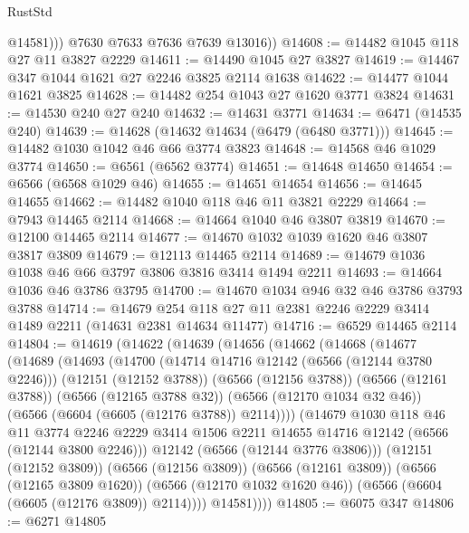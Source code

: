 \begin{lexlean}{RustStd}
\begin{coremodule}
              @14581)))
        @7630
        @7633
        @7636
        @7639
        @13016))
@14608 := @14482 @1045 @118 @27 @11 @3827 @2229
@14611 := @14490 @1045 @27 @3827
@14619 := @14467 @347 @1044 @1621 @27 @2246 @3825 @2114 @1638
@14622 := @14477 @1044 @1621 @3825
@14628 := @14482 @254 @1043 @27 @1620 @3771 @3824
@14631 := @14530 @240 @27 @240
@14632 := @14631 @3771
@14634 := @6471 (@14535 @240)
@14639 := @14628 (@14632 @14634 (@6479 (@6480 @3771)))
@14645 := @14482 @1030 @1042 @46 @66 @3774 @3823
@14648 := @14568 @46 @1029 @3774
@14650 := @6561 (@6562 @3774)
@14651 := @14648 @14650
@14654 := @6566 (@6568 @1029 @46)
@14655 := @14651 @14654
@14656 := @14645 @14655
@14662 := @14482 @1040 @118 @46 @11 @3821 @2229
@14664 := @7943 @14465 @2114
@14668 := @14664 @1040 @46 @3807 @3819
@14670 := @12100 @14465 @2114
@14677 := @14670 @1032 @1039 @1620 @46 @3807 @3817 @3809
@14679 := @12113 @14465 @2114
@14689 := @14679 @1036 @1038 @46 @66 @3797 @3806 @3816 @3414 @1494 @2211
@14693 := @14664 @1036 @46 @3786 @3795
@14700 := @14670 @1034 @946 @32 @46 @3786 @3793 @3788
@14714 := @14679 @254 @118 @27 @11 @2381 @2246 @2229 @3414 @1489 @2211 (@14631 @2381 @14634 @11477)
@14716 := @6529 @14465 @2114
@14804 := @14619
    (@14622
      (@14639
        (@14656
          (@14662
            (@14668
              (@14677
                (@14689
                  (@14693
                    (@14700
                      (@14714 @14716 @12142 (@6566 (@12144 @3780 @2246)))
                      (@12151 (@12152 @3788))
                      (@6566 (@12156 @3788))
                      (@6566 (@12161 @3788))
                      (@6566 (@12165 @3788 @32))
                      (@6566 (@12170 @1034 @32 @46))
                      (@6566 (@6604 (@6605 (@12176 @3788)) @2114))))
                  (@14679
                    @1030
                    @118
                    @46
                    @11
                    @3774
                    @2246
                    @2229
                    @3414
                    @1506
                    @2211
                    @14655
                    @14716
                    @12142
                    (@6566 (@12144 @3800 @2246)))
                  @12142
                  (@6566 (@12144 @3776 @3806)))
                (@12151 (@12152 @3809))
                (@6566 (@12156 @3809))
                (@6566 (@12161 @3809))
                (@6566 (@12165 @3809 @1620))
                (@6566 (@12170 @1032 @1620 @46))
                (@6566 (@6604 (@6605 (@12176 @3809)) @2114))))
            @14581))))
@14805 := @6075 @347
@14806 := @6271 @14805

\end{coremodule}
\end{lexlean}
